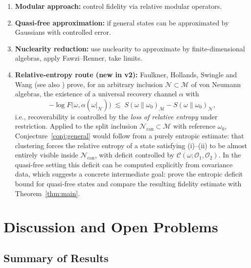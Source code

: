 \documentclass[11pt,a4paper]{article}
\theoremstyle{plain}
\theoremstyle{definition}
\theoremstyle{remark}
\newcommand{\Nn}{\mathcal{N}}
\newcommand{\Mm}{\mathcal{M}}
\newcommand{\Oo}{\mathcal{O}}
\newcommand{\Ncan}{\Nn_{\mathrm{can}}}
\begin{document}
\begin{enumerate}
\item \textbf{Modular approach:} control fidelity via relative modular operators.
\item \textbf{Quasi-free approximation:} if general states can be approximated by
Gaussians with controlled error.
\item \textbf{Nuclearity reduction:} use nuclearity to approximate by
finite-dimensional algebras, apply Fawzi--Renner, take limits.
\item \textbf{Relative-entropy route (new in v2):} Faulkner, Hollands, Swingle and
Wang \cite{FHSW22} (see also \cite{FH22,JungeLaRacuente22}) prove, for an arbitrary
inclusion $\Nn \subset \Mm$ of von Neumann algebras, the existence of a universal
recovery channel $\alpha$ with
\begin{equation}
-\log F\big(\omega, \alpha(\omega|_{\Nn})\big) \;\lesssim\;
S(\omega\|\omega_0)_{\Mm} - S(\omega\|\omega_0)_{\Nn},
\end{equation}
i.e., recoverability is controlled by the \emph{loss of relative entropy} under
restriction. Applied to the split inclusion $\Ncan \subset \Mm$ with reference
$\omega_0$, Conjecture~\ref{conj:general} would follow from a purely
entropic estimate: that clustering forces the relative entropy of a state
satisfying (i)--(ii) to be almost entirely visible inside $\Ncan$, with deficit
controlled by $\mathcal{C}(\omega;\Oo_1,\Oo_2)$. In the quasi-free setting this
deficit can be computed explicitly from covariance data, which suggests a concrete
intermediate goal: prove the entropic deficit bound for quasi-free states and
compare the resulting fidelity estimate with Theorem~\ref{thm:main}.
\end{enumerate}

\section{Discussion and Open Problems}\label{sec:discussion}

\subsection{Summary of Results}
\end{document}
